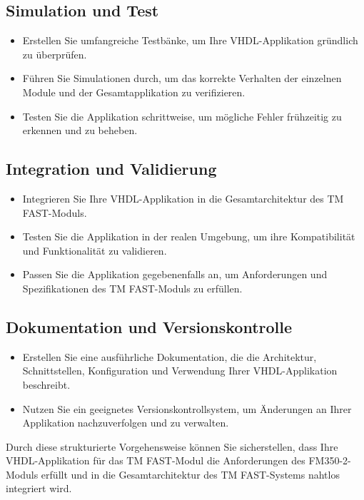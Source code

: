 \subsection*{Simulation und Test} 
\begin{itemize} 
    \item Erstellen Sie umfangreiche Testbänke, um Ihre VHDL-Applikation gründlich zu überprüfen. 
    \item Führen Sie Simulationen durch, um das korrekte Verhalten der einzelnen Module und der Gesamtapplikation zu verifizieren. 
    \item Testen Sie die Applikation schrittweise, um mögliche Fehler frühzeitig zu erkennen und zu beheben. 
\end{itemize}

\subsection*{Integration und Validierung} 
\begin{itemize} 
    \item Integrieren Sie Ihre VHDL-Applikation in die Gesamtarchitektur des TM FAST-Moduls. 
    \item Testen Sie die Applikation in der realen Umgebung, um ihre Kompatibilität und Funktionalität zu validieren. 
    \item Passen Sie die Applikation gegebenenfalls an, um Anforderungen und Spezifikationen des TM FAST-Moduls zu erfüllen. 
\end{itemize}

\subsection*{Dokumentation und Versionskontrolle} 
\begin{itemize} 
    \item Erstellen Sie eine ausführliche Dokumentation, die die Architektur, Schnittstellen, Konfiguration und Verwendung Ihrer 
    VHDL-Applikation beschreibt. 
    \item Nutzen Sie ein geeignetes Versionskontrollsystem, um Änderungen an Ihrer Applikation nachzuverfolgen und zu verwalten. 
\end{itemize}

Durch diese strukturierte Vorgehensweise können Sie sicherstellen, dass Ihre VHDL-Applikation für das TM FAST-Modul die 
Anforderungen des FM350-2-Moduls erfüllt und in die Gesamtarchitektur des TM FAST-Systems nahtlos integriert wird.

